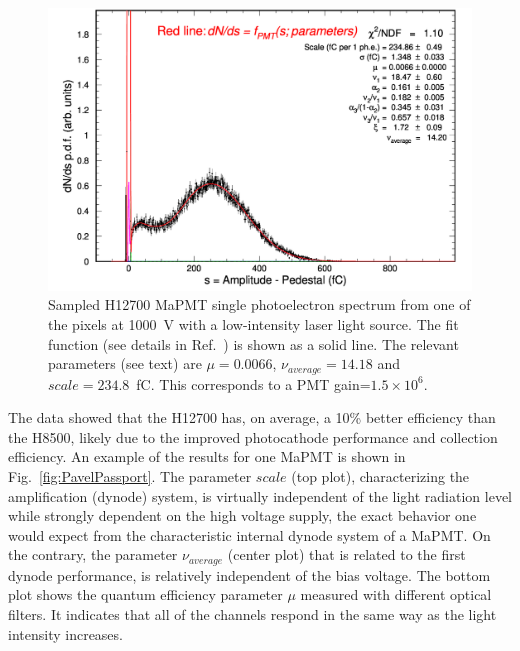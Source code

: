 \documentclass[5p,times,twocolumn]{elsarticle}
\def\MaPMT{MaPMT }
\begin{document}
\begin{figure}[ht]
	\centering
	\includegraphics[width=\linewidth]{H12700-r-W0-GA0982-w3-g064-v1000-t227-37.pdf}
	\caption{Sampled H12700 \MaPMT single photoelectron spectrum from one of the pixels at 1000~V with a low-intensity
          laser light source. The fit function (see details in Ref.~\cite{Pavel}) is shown as a solid line. 
          The relevant parameters (see text) are $\mu=0.0066$, $\nu_{average}=14.18$ and $scale=234.8$~fC. This corresponds
          to a PMT gain=$1.5 \times 10^6$.
          }
	\label{fig:SPEH12700}
\end{figure}

The data showed that the H12700 has, on average, a 10\% better efficiency than the H8500, likely due to the improved
photocathode performance and collection efficiency. An example of the results for one MaPMT is shown in
Fig.~\ref{fig:PavelPassport}. The parameter $scale$ (top plot), characterizing the amplification (dynode) system, is
virtually independent of the light radiation level while strongly dependent on the high voltage supply, the exact behavior
one would expect from the characteristic internal dynode system of a MaPMT. On the contrary, the parameter $\nu_{average}$
(center plot) that is related to the first dynode performance, is relatively independent of the bias voltage. The bottom
plot shows the quantum efficiency parameter $\mu$ measured with different optical filters. It indicates that all of
the channels respond in the same way as the light intensity increases.
\end{document}
